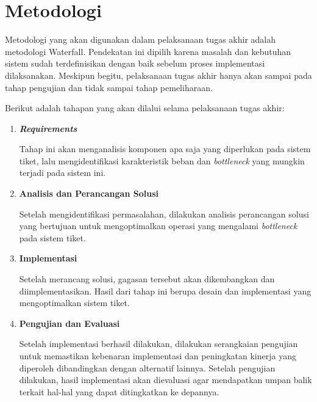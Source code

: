\section{Metodologi}

Metodologi yang akan digunakan dalam pelaksanaan tugas akhir adalah metodologi Waterfall. Pendekatan ini dipilih karena masalah dan kebutuhan sistem sudah terdefinisikan dengan baik sebelum proses implementasi dilaksanakan. Meskipun begitu, pelaksanaan tugas akhir hanya akan sampai pada tahap pengujian dan tidak sampai tahap pemeliharaan.

Berikut adalah tahapan yang akan dilalui selama pelaksanaan tugas akhir:

\begin{enumerate}
      \item \textbf{\textit{Requirements}}

            Tahap ini akan menganalisis komponen apa saja yang diperlukan pada sistem tiket, lalu mengidentifikasi karakteristik beban dan \textit{bottleneck} yang mungkin terjadi pada sistem ini.

      \item \textbf{Analisis dan Perancangan Solusi}

            Setelah mengidentifikasi permasalahan, dilakukan analisis perancangan solusi yang bertujuan untuk mengoptimalkan operasi yang mengalami \textit{bottleneck} pada sistem tiket.

      \item \textbf{Implementasi}

            Setelah merancang solusi, gagasan tersebut akan dikembangkan dan diimplementasikan. Hasil dari tahap ini berupa desain dan implementasi yang mengoptimalkan sistem tiket.

      \item \textbf{Pengujian dan Evaluasi}

            Setelah implementasi berhasil dilakukan, dilakukan serangkaian pengujian untuk memastikan kebenaran implementasi dan peningkatan kinerja yang diperoleh dibandingkan dengan alternatif lainnya. Setelah pengujian dilakukan, hasil implementasi akan dievaluasi agar mendapatkan umpan balik terkait hal-hal yang dapat ditingkatkan ke depannya.

\end{enumerate}